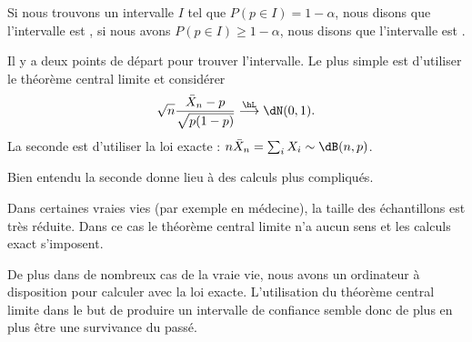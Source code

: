 Si nous trouvons un intervalle \( I\) tel que \( P(p\in I)=1-\alpha\), nous disons que l'intervalle est , si nous avons \( P(p\in I)\geq 1-\alpha\), nous disons que l'intervalle est .

Il y a deux points de départ pour trouver l'intervalle. Le plus simple est d'utiliser le théorème central limite et considérer
\begin{equation}
	\sqrt{n}\frac{ \bar X_n-p }{ \sqrt{p(1-p)} }\stackrel{\hL}{\longrightarrow}\dN(0,1).
\end{equation}
La seconde est d'utiliser la loi exacte : \( n\bar X_n=\sum_i X_i\sim \dB(n,p)\).

Bien entendu la seconde donne lieu à des calculs plus compliqués.

\begin{remark}
	Dans certaines vraies vies (par exemple en médecine), la taille des échantillons est très réduite. Dans ce cas le théorème central limite n'a aucun sens et les calculs exact s'imposent.

	De plus dans de nombreux cas de la vraie vie, nous avons un ordinateur à disposition pour calculer avec la loi exacte. L'utilisation du théorème central limite dans le but de produire un intervalle de confiance semble donc de plus en plus être une survivance du passé.
\end{remark}

